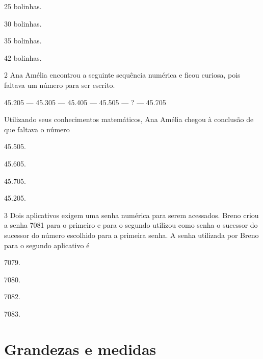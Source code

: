 \begin{mdframed}[linewidth=2pt,linecolor=salmao,roundcorner=2pt]
\begin{escolha}
\item
  25 bolinhas.
\item
  30 bolinhas.
\item
  35 bolinhas.
\item
  42 bolinhas.
\end{escolha}

\num{2} Ana Amélia encontrou a seguinte sequência numérica e ficou curiosa, pois
faltava um número para ser escrito.

\begin{mdframed}[linewidth=2pt,linecolor=azul!20,backgroundcolor=azul!20,roundcorner=2pt]
45.205 --- 45.305 --- 45.405 --- 45.505 --- ? --- 45.705
\end{mdframed}

Utilizando seus conhecimentos matemáticos, Ana Amélia chegou à conclusão de que
faltava o número

\begin{escolha}
\item
  45.505.
\item
  45.605.
\item
  45.705.
\item
  45.205.
\end{escolha}

\num{3} Dois aplicativos exigem uma senha numérica para serem acessados. Breno
criou a senha 7081 para o primeiro e para o segundo utilizou como senha
o sucessor do sucessor do número escolhido para a primeira senha. A
senha utilizada por Breno para o segundo aplicativo é

\begin{escolha}
\item
  7079.
\item
  7080.
\item
  7082.
\item
  7083.
\end{escolha}

\chapter{Grandezas e medidas}



\end{mdframed}
